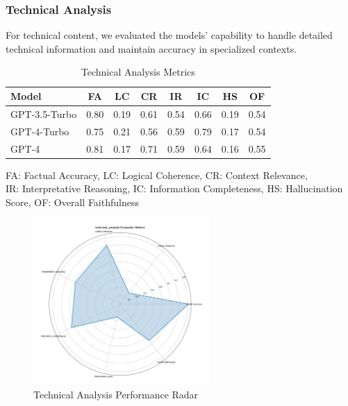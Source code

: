 \subsubsection{Technical Analysis}
For technical content, we evaluated the models' capability to handle detailed technical information and maintain accuracy in specialized contexts.

\begin{table}[!htbp]
\centering
\setlength{\tabcolsep}{4pt}  %
\begin{tabular}{|l|c|c|c|c|c|c|c|}
\hline
\textbf{Model} & \textbf{FA} & \textbf{LC} & \textbf{CR} & \textbf{IR} 
& \textbf{IC} & \textbf{HS} & \textbf{OF} \\
\hline
GPT-3.5-Turbo & 0.80 & 0.19 & 0.61 & 0.54 & 0.66 & 0.19 & 0.54 \\
GPT-4-Turbo & 0.75 & 0.21 & 0.56 & 0.59 & 0.79 & 0.17 & 0.54 \\
GPT-4 & 0.81 & 0.17 & 0.71 & 0.59 & 0.64 & 0.16 & 0.55 \\
\hline
\end{tabular}
\caption{Technical Analysis Metrics}
\label{tab:results_technical_metrics}
\begin{flushleft}
\small
FA: Factual Accuracy, LC: Logical Coherence, CR: Context Relevance,\\
IR: Interpretative Reasoning, IC: Information Completeness, HS: Hallucination Score, OF: Overall Faithfulness
\end{flushleft}
\end{table}

\begin{figure}[!htbp]
\centering
\includegraphics[width=0.6\textwidth]{figures/types/technical_analysis_radar_gpt-4.png}
\caption{Technical Analysis Performance Radar}
\label{fig:technical_radar}
\end{figure}

